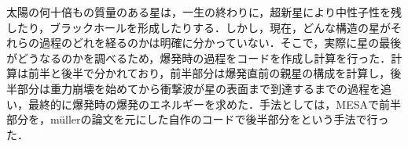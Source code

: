 \begin{jabstract}

太陽の何十倍もの質量のある星は，一生の終わりに，超新星により中性子性を残したり，ブラックホールを形成したりする．しかし，現在，どんな構造の星がそれらの過程のどれを経るのかは明確に分かっていない．そこで，実際に星の最後がどうなるのかを調べるため，爆発時の過程をコードを作成し計算を行った．計算は前半と後半で分かれており，前半部分は爆発直前の親星の構成を計算し，後半部分は重力崩壊を始めてから衝撃波が星の表面まで到達するまでの過程を追い，最終的に爆発時の爆発のエネルギーを求めた．手法としては，MESA\cite{mesa}で前半部分を，m\"{u}llerの論文\cite{muller}を元にした自作のコードで後半部分をという手法で行った．

\end{jabstract}

